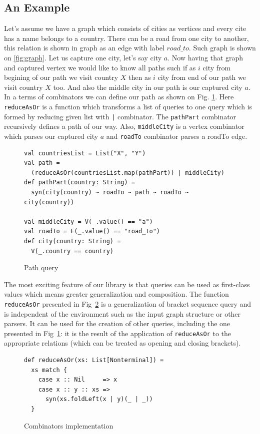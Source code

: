 \subsection{An Example}
Let's assume we have a graph which consists of cities as vertices and every cite has a name belongs to a country. There can be a road from one city to another, this relation is shown in graph as an edge with label $road\_to$. Such graph is shown on \ref{fig:graph}. Let us capture one city, let's say city $a$. Now having that graph and captured vertex we would like to know all paths such if as $i$ city from begining of our path we visit country $X$ then as $i$ city from end of our path we visit country $X$ too. And also the middle city in our path is our captured city $a$.
In a terms of combinators we can define our path as shown on Fig. \ref{fig:pathQuery}. Here \lstinline{reduceAsOr} is a function which transforms a list of queries to one query which is formed by reducing given list with \lstinline{|} combinator. The \lstinline{pathPart} combinator recursively defines a path of our way. Also, \lstinline{middleCity} is a vertex combinator which parses our captured city $a$ and \lstinline{roadTo} combinator parses a roadTo edge.

\begin{figure}[h]
\begin{lstlisting}
val countriesList = List("X", "Y")
val path = 
  (reduceAsOr(countriesList.map(pathPart)) | middleCity)
def pathPart(country: String) =
  syn(city(country) ~ roadTo ~ path ~ roadTo ~ city(country))

val middleCity = V(_.value() == "a")
val roadTo = E(_.value() == "road_to")
def city(country: String) =
  V(_.country == country)
\end{lstlisting}
\caption{Path query}
\label{fig:pathQuery}
\end{figure}


The most exciting feature of our library is that queries can be used as first-class values which means greater generalization and composition. 
The function \lstinline{reduceAsOr} presented in Fig~\ref{fig:reduceAsOr} is a generalization of bracket sequence query and is independent of the environment such as the input graph structure or other parsers.
It can be used for the creation of other queries, including the one presented in Fig~\ref{fig:pathQuery}: it is the result of the application of \lstinline{reduceAsOr} to the appropriate relations (which can be treated as opening and closing brackets).

\begin{figure}[h]
\begin{lstlisting}
def reduceAsOr(xs: List[Nonterminal]) = 
  xs match {
    case x :: Nil     => x
    case x :: y :: xs => 
      syn(xs.foldLeft(x | y)(_ | _))
  }
\end{lstlisting}
\caption{Combinators implementation}
\label{fig:reduceAsOr}
\end{figure}

